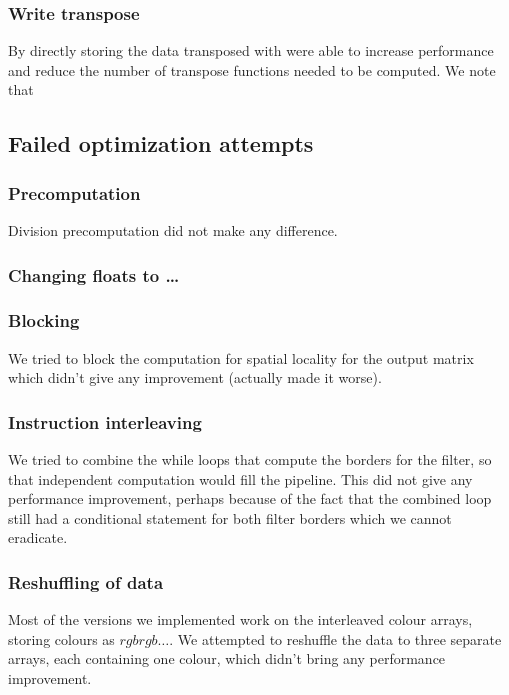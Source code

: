 \subsubsection{Write transpose}
By directly storing the data transposed with were able to increase performance and reduce the number of transpose functions needed to be computed. We note that 

\subsection{Failed optimization attempts}

\subsubsection{Precomputation} Division precomputation did not make any difference.

\subsubsection{Changing floats to \dots}


\subsubsection{Blocking}

We tried to block the computation for spatial locality for the output matrix which didn't give any improvement (actually made it worse).

\subsubsection{Instruction interleaving}

We tried to combine the while loops that compute the borders for the filter, so that independent computation would fill the pipeline. This did not give any performance improvement, perhaps because of the fact that the combined loop still had a conditional statement for both filter borders which we cannot eradicate.

\subsubsection{Reshuffling of data}

Most of the versions we implemented work on the interleaved colour arrays, storing colours as $rgbrgb\dots$. We attempted to reshuffle the data to three separate arrays, each containing one colour, which didn't bring any performance improvement. 

